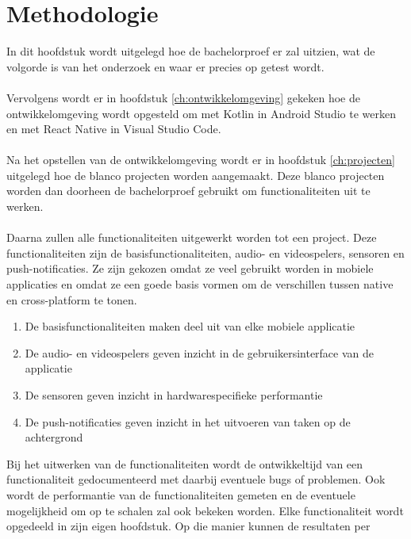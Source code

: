 
\chapter{Methodologie}
\label{ch:methodologie}

In dit hoofdstuk wordt uitgelegd hoe de bachelorproef er zal uitzien, wat 
de volgorde is van het onderzoek en waar er precies op getest wordt.
\\\\
Vervolgens wordt er in hoofdstuk \ref{ch:ontwikkelomgeving} gekeken hoe 
de ontwikkelomgeving wordt opgesteld om met Kotlin in Android Studio 
te werken en met React Native in Visual Studio Code.
\\\\
Na het opstellen van de ontwikkelomgeving wordt er in hoofdstuk 
\ref{ch:projecten} uitgelegd hoe de blanco projecten worden aangemaakt. 
Deze blanco projecten worden dan doorheen de bachelorproef gebruikt om 
functionaliteiten uit te werken.
\\\\
Daarna zullen alle functionaliteiten uitgewerkt worden tot een project. 
Deze functionaliteiten zijn de basisfunctionaliteiten, audio- en
videospelers, sensoren en push-notificaties. Ze 
zijn gekozen omdat ze veel gebruikt worden in mobiele applicaties en
omdat ze een goede basis vormen om de verschillen tussen native en cross-platform 
te tonen. 
\begin{enumerate}
    \item De basisfunctionaliteiten maken deel uit van elke mobiele applicatie
    \item De audio- en videospelers geven inzicht in de gebruikersinterface van de applicatie
    \item De sensoren geven inzicht in hardwarespecifieke performantie
    \item De push-notificaties geven inzicht in het uitvoeren van taken op de achtergrond
\end{enumerate}
Bij het uitwerken van de functionaliteiten wordt 
de ontwikkeltijd van een functionaliteit gedocumenteerd 
met daarbij eventuele bugs of problemen. Ook wordt de performantie van 
de functionaliteiten gemeten en de eventuele mogelijkheid om op te 
schalen zal ook bekeken worden. Elke functionaliteit wordt opgedeeld 
in zijn eigen hoofdstuk. Op die manier kunnen de resultaten per 
